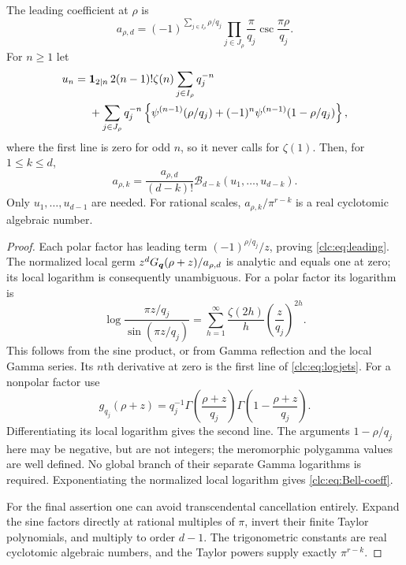 \begin{theorem}\label{clc:thm:coeff}
The leading coefficient at $\rho$ is
\begin{equation}\label{clc:eq:leading}
 a_{\rho,d}=(-1)^{\sum_{j\in I_\rho}\rho/q_j}
 \prod_{j\in J_\rho}\frac{\pi}{q_j}\csc\frac{\pi\rho}{q_j}.
\end{equation}
For $n\ge1$ let
\begin{align}
 u_n={}&\boldsymbol1_{2\mid n}\,2(n-1)!\zeta(n)
              \sum_{j\in I_\rho}q_j^{-n}\notag\\
 &+\sum_{j\in J_\rho}q_j^{-n}
 \left\{\psi^{(n-1)}(\rho/q_j)
       +(-1)^n\psi^{(n-1)}(1-\rho/q_j)\right\},
 \label{clc:eq:logjets}
\end{align}
where the first line is zero for odd $n$, so it never calls for
$\zeta(1)$. Then, for $1\le k\le d$,
\begin{equation}\label{clc:eq:Bell-coeff}
 a_{\rho,k}=\frac{a_{\rho,d}}{(d-k)!}
                  \mathcal B_{d-k}(u_1,\ldots,u_{d-k}).
\end{equation}
Only $u_1,\ldots,u_{d-1}$ are needed. For rational scales,
$a_{\rho,k}/\pi^{r-k}$ is a real cyclotomic algebraic number.
\end{theorem}
\begin{proof}
Each polar factor has leading term
$(-1)^{\rho/q_j}/z$, proving \eqref{clc:eq:leading}.
The normalized local germ
$z^dG_{\boldsymbol q}(\rho+z)/a_{\rho,d}$ is analytic and equals one at zero;
its local logarithm is consequently unambiguous.
For a polar factor its logarithm is
\[
 \log\frac{\pi z/q_j}{\sin(\pi z/q_j)}
 =\sum_{h=1}^\infty\frac{\zeta(2h)}{h}\left(\frac z{q_j}\right)^{2h}.
\]
This follows from the sine product, or from Gamma reflection and the
local Gamma series. Its $n$th derivative at zero is the first line of
\eqref{clc:eq:logjets}.
For a nonpolar factor use
\[
 g_{q_j}(\rho+z)=q_j^{-1}
 \Gamma\left(\frac{\rho+z}{q_j}\right)
 \Gamma\left(1-\frac{\rho+z}{q_j}\right).
\]
Differentiating its local logarithm gives the second line. The arguments
$1-\rho/q_j$ here may be negative, but are not integers; the meromorphic
polygamma values are well defined. No global branch of their separate
Gamma logarithms is required. Exponentiating the normalized local
logarithm gives \eqref{clc:eq:Bell-coeff}.

For the final assertion one can avoid transcendental cancellation
entirely. Expand the sine factors directly at rational multiples of
$\pi$, invert their finite Taylor polynomials, and multiply to order
$d-1$. The trigonometric constants are real cyclotomic algebraic
numbers, and the Taylor powers supply exactly $\pi^{r-k}$.
\end{proof}

